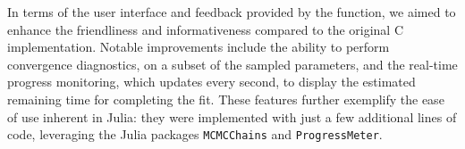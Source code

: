 \documentclass[12pt,	%
	a4paper,		%
	twoside,		%
	openright,		%
	titlepage,%
	]{book}
\theoremstyle{definition}
\let\cite\citep
\newcommand{\mjline}[1]{\texttt{#1}}
\newenvironment{code}{\captionsetup{type=listing}}{}
\begin{document}

In terms of the user interface and feedback provided by the function, we aimed to enhance the friendliness and informativeness compared to the original C implementation. Notable improvements include the ability to perform convergence diagnostics, on a subset of the sampled parameters, and the real-time progress monitoring, which updates every second, to display the estimated remaining time for completing the fit. These features further exemplify the ease of use inherent in Julia: they were implemented with just a few additional lines of code, leveraging the Julia packages \mjline{MCMCChains} \cite{mcmc-chain} and \mjline{ProgressMeter}.



\end{document}
